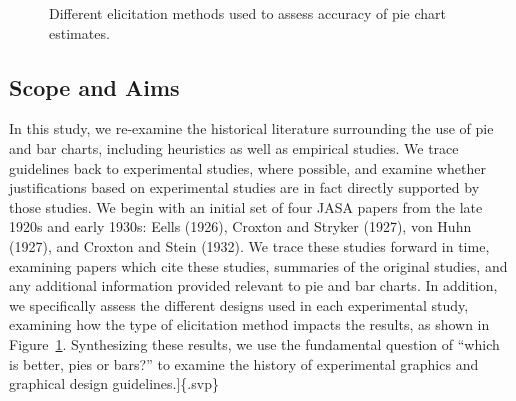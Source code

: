 \documentclass[
  10pt,
  letterpaper,
  twocolumn]{article}
\begin{document}
\begin{figure}


\caption{\label{fig-elicitation}Different elicitation methods used to
assess accuracy of pie chart estimates.}

\end{figure}%

\subsection{Scope and Aims}\label{scope-and-aims}

In this study, we re-examine the historical literature surrounding the
use of pie and bar charts, including heuristics as well as empirical
studies. We trace guidelines back to experimental studies, where
possible, and examine whether justifications based on experimental
studies are in fact directly supported by those studies. We begin with
an initial set of four JASA papers from the late 1920s and early 1930s:
Eells (1926), Croxton and Stryker (1927), von Huhn (1927), and Croxton
and Stein (1932). We trace these studies forward in time, examining
papers which cite these studies, summaries of the original studies, and
any additional information provided relevant to pie and bar charts. In
addition, we specifically assess the different designs used in each
experimental study, examining how the type of elicitation method impacts
the results, as shown in Figure~\ref{fig-elicitation}. Synthesizing
these results, we use the fundamental question of ``which is better,
pies or bars?'' to examine the history of experimental graphics and
graphical design guidelines.{]}\{.svp\}
\end{document}
